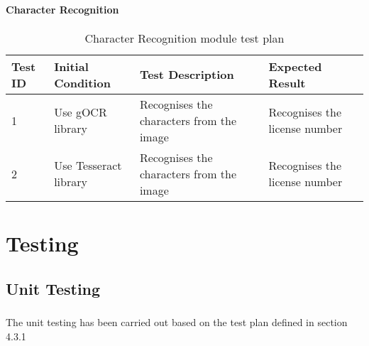 \documentclass[a4paper,10pt]{iesreport}
\begin{document}
\subsubsection*{Character Recognition}
\begin{table}
\caption{Character Recognition module test plan}
\begin{tabular}{p{3.2cm}|p{3.2cm}|p{5cm}|p{3.5cm}}
\hline
\textbf{Test ID} & \textbf{Initial Condition} & \textbf{Test Description} & \textbf{Expected Result} \\ [0.3ex]
\hline
1 & Use gOCR library & Recognises the characters from the image &  Recognises the license number
\\ \hline
2 & Use Tesseract library & Recognises the characters from the image &  Recognises the license number \\
\hline
\end{tabular}
\label{table:nonlin}
\end{table}
\newpage
\chapter{Testing}
\section{Unit Testing}
\paragraph*{}
The unit testing has been carried out based on the test plan defined in section 4.3.1
\end{document}
